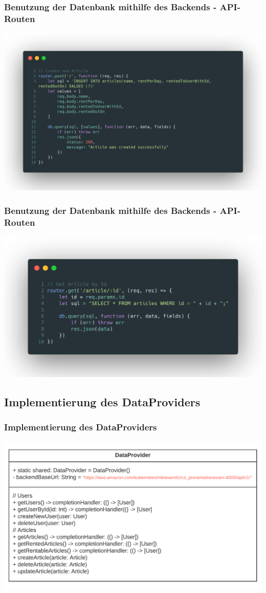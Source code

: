 \documentclass[aspectratio=169]{beamer}
\begin{document}
\begin{frame}
	\frametitle{Benutzung der Datenbank mithilfe des Backends - API-Routen}
	\includegraphics[width=\textwidth]{presentation/image03}
\end{frame}

\begin{frame}
	\frametitle{Benutzung der Datenbank mithilfe des Backends - API-Routen}
	\includegraphics[width=\textwidth]{presentation/image04}
\end{frame}

\subsection{Implementierung des DataProviders}
\begin{frame}
	\frametitle{Implementierung des DataProviders}
	\includegraphics[width=\textwidth]{presentation/image09}
\end{frame}
\end{document}

